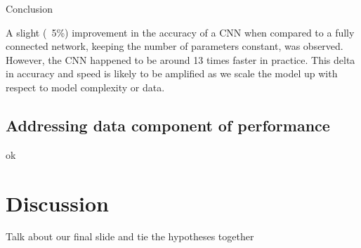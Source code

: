\documentclass[12pt]{article}
\begin{document}
Conclusion

A slight (~5\%) improvement in the accuracy of a CNN when compared to a fully connected network, keeping the number of parameters constant, was observed. However, the CNN happened to be around 13 times faster in practice. This delta in accuracy and speed is likely to be amplified as we scale the model up with respect to model complexity or data.

\subsection{Addressing data component of performance}

ok

\section{Discussion}

Talk about our final slide and tie the hypotheses together





\end{document}
